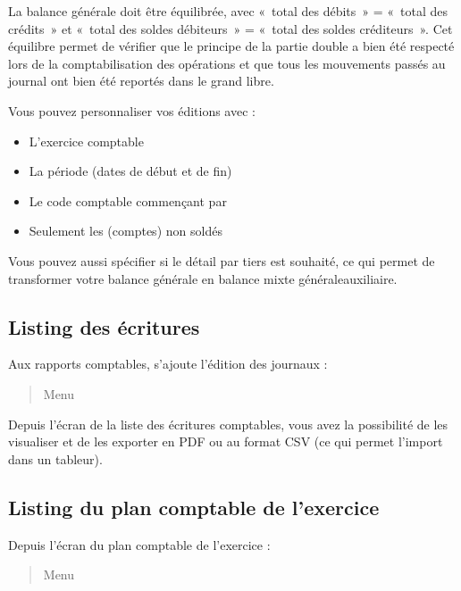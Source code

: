 \documentclass[a4paper,10pt,oneside,french]{sphinxmanual}
\begin{document}
\sphinxAtStartPar
La balance générale doit être équilibrée, avec « total des débits » = « total des crédits » et « total des soldes débiteurs » = « total des soldes créditeurs ». Cet équilibre permet de vérifier que le principe de la partie double a bien été respecté lors de la comptabilisation des opérations et que tous les mouvements passés au journal ont bien été reportés dans le grand libre.

\sphinxAtStartPar
Vous pouvez personnaliser vos éditions avec :
\begin{itemize}
\item {} 
\sphinxAtStartPar
L’exercice comptable

\item {} 
\sphinxAtStartPar
La période (dates de début et de fin)

\item {} 
\sphinxAtStartPar
Le code comptable commençant par

\item {} 
\sphinxAtStartPar
Seulement les (comptes) non soldés

\end{itemize}

\sphinxAtStartPar
Vous pouvez aussi spécifier si le détail par tiers est souhaité, ce qui permet de transformer votre balance générale en balance mixte générale\sphinxhyphen{}auxiliaire.


\subsection{Listing des écritures}
\label{\detokenize{accounting/reporting:listing-des-ecritures}}
\sphinxAtStartPar
Aux rapports comptables, s’ajoute l’édition des journaux :
\begin{quote}

\sphinxAtStartPar
Menu 
\end{quote}

\sphinxAtStartPar
Depuis l’écran de la liste des écritures comptables, vous avez la possibilité de les visualiser et de les exporter en PDF ou  au format CSV (ce qui permet l’import dans un tableur).


\subsection{Listing du plan comptable de l’exercice}
\label{\detokenize{accounting/reporting:listing-du-plan-comptable-de-l-exercice}}
\sphinxAtStartPar
Depuis l’écran du plan comptable de l’exercice :
\begin{quote}

\sphinxAtStartPar
Menu 
\end{quote}
\end{document}
